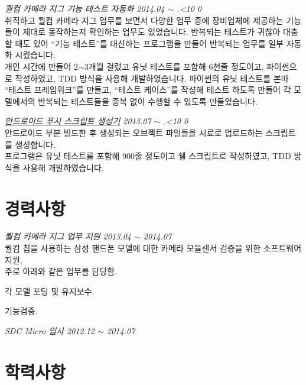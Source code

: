 \documentclass[line,margin]{res}
\renewcommand{\today}{\number\year.\ifnum\number\month<10 0\fi \number\month}
\begin{document}
\begin{resume}
  {\sl 퀄컴 카메라 지그 기능 테스트 자동화 \hfill 2014.04 $\sim$ \today} \vspace{1mm} \\
  {\small
    취직하고 퀄컴 카메라 지그 업무를 보면서 다양한 업무 중에 장비업체에 제공하는 기능들이 제대로 동작하는지 확인하는 업무도 있었습니다.
    반복되는 테스트가 귀찮아 대충할 때도 있어 ``기능 테스트''를 대신하는 프로그램을 만들어 반복되는 업무를 일부 자동화 시켰습니다. \\
    개인 시간에 만들어 2$\sim$3개월 걸렸고 유닛 테스트를 포함해 6천줄 정도이고, 파이썬으로 작성하였고, TDD 방식을 사용해 개발하였습니다.
    파이썬의 유닛 테스트를 본따 ``테스트 프레임워크''를 만들고, ``테스트 케이스''를 작성해 테스트 하도록 만들어
    각 모델에서의 반복되는 테스트들을 중복 없이 수행할 수 있도록 만들었습니다.}

  {\sl \href{https://github.com/vmfhrmfoaj/mmm-bat/tree/develop}
    {안드로이드 푸시 스크립트 생성기} \hfill 2013.07 $\sim$ \today} \vspace{1mm} \\
  {\small
    안드로이드 부분 빌드한 후 생성되는 오브젝트 파일들을 시료로 업로드하는 스크립트를 생성합니다. \\
    프로그램은 유닛 테스트를 포함해 900줄 정도이고 쉘 스크립트로 작성하였고, TDD 방식을 사용해 개발하였습니다.}


  \section{경력사항}

  {\sl 퀄컴 카메라 지그 업무 지원 \hfill 2013.04 $\sim$ 2014.07} \vspace{1mm} \\
  {\small
    퀄컴 칩을 사용하는 삼성 핸드폰 모델에 대한 카메라 모듈센서 검증을 위한 소프트웨어 지원, \\
    주로 아래와 같은 업무를 담당함.}
  \vspace{1mm}
  \begin{itemize}
    {\small
    \item[-] 각 모델 포팅 및 유지보수. \vspace{-1mm}
    \item[-] 기능검증.}
  \end{itemize}

  {\sl SDC Micro 입사 \hfill 2012.12 $\sim$ 2014.07} \vspace{0mm}


  \section{학력사항}


\end{resume}
\end{document}
